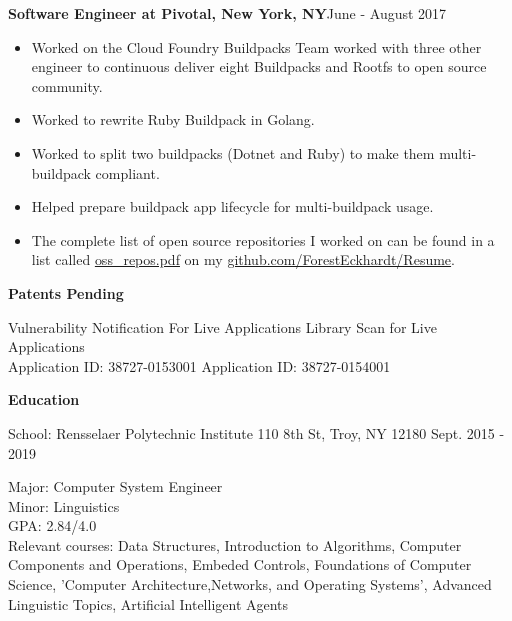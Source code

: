 \documentclass[10pt,a4papaer]{article}
\begin{document}
{	{\noindent\textbf{Software Engineer at Pivotal, New York, NY}}{\hfill June - August 2017}
	\begin{itemize}[noitemsep, topsep=0pt]
		\item Worked on the Cloud Foundry Buildpacks Team worked with three other engineer to continuous deliver eight Buildpacks and Rootfs to open source community. 
		\item Worked to rewrite Ruby Buildpack in Golang.
		\item Worked to split two buildpacks (Dotnet and Ruby) to make them multi-buildpack compliant.
		\item Helped prepare buildpack app lifecycle for multi-buildpack usage.
		\item The complete list of open source repositories I worked on can be found in a list called \href{http://www.github.com/ForestEckhardt/Resume/blob/master/oss_repos.pdf}{ oss\_repos.pdf} on my \href{http://www.github.com/ForestEckhardt/Resume}{github.com/ForestEckhardt/Resume}.\\
		
	\end{itemize}
	
	\setlength{\leftskip}{0pt}
	
	{\noindent\textbf{Patents Pending}\vspace*{-20px}\\}
	
	\noindent\makebox[\linewidth]{\rule{\textwidth}{1.2pt}}
	
	\setlength{\leftskip}{15pt}
	
	\noindent Vulnerability Notification For Live Applications {\hfill Library Scan for Live Applications}\\
	Application ID: 38727-0153001 {\hfill Application ID: 38727-0154001\quad}\\
	
	\setlength{\leftskip}{0pt}
	
	{\noindent\textbf{Education}}\vspace*{-20px}\\
	
	\noindent\makebox[\linewidth]{\rule{\textwidth}{1.3pt}}
	
	{ School: Rensselaer Polytechnic Institute 110 8th St, Troy, NY 12180 {\hfill Sept. 2015 - 2019}}
	
	\setlength{\leftskip}{50pt}
	
	{\noindent Major: Computer System Engineer\\ Minor: Linguistics\\
		GPA: 2.84/4.0\\
		Relevant courses: Data Structures, Introduction to Algorithms, Computer Components and Operations, Embeded Controls, Foundations of Computer Science, 'Computer Architecture,Networks, and Operating Systems', Advanced Linguistic Topics, Artificial Intelligent Agents}\\
	
}
\end{document}
